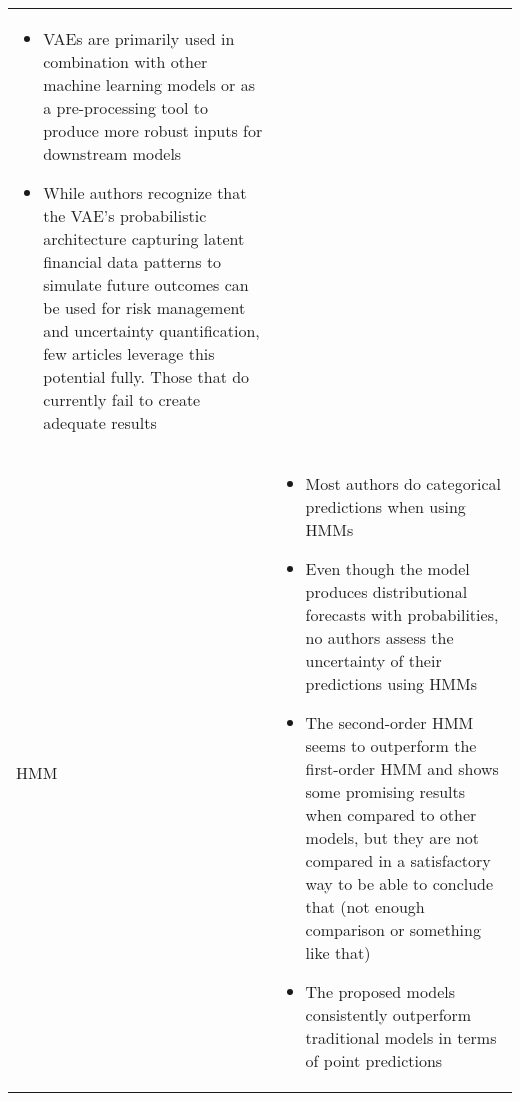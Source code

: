 \begin{table}[H]
\begin{adjustbox}{width=1\textwidth,center}
\begin{tabular}{p{}p{}}
\begin{itemize}[left=0pt]
            \item VAEs are primarily used in combination with other machine learning models or as a pre-processing tool to produce more robust inputs for downstream models
            \item While authors recognize that the VAE’s probabilistic architecture capturing latent financial data patterns to simulate future outcomes can be used for risk management and uncertainty quantification, few articles leverage this potential fully. Those that do currently fail to create adequate results
        \end{itemize}\\
        \addlinespace
        \hdashline[0.2pt/3pt]
        \addlinespace
        HMM & 
        \begin{itemize}[left=0pt]
        \vspace{-4mm}
            \item Most authors do categorical predictions when using HMMs
            \item Even though the model produces distributional forecasts with probabilities, no authors assess the uncertainty of their predictions using HMMs
            \item The second-order HMM seems to outperform the first-order HMM and shows some promising results when compared to other models, but they are not compared in a satisfactory way to be able to conclude that (not enough comparison or something like that)
            \item The proposed models consistently outperform traditional models in terms of point predictions
        \end{itemize}\\


\end{tabular}
\end{adjustbox}
\end{table}
